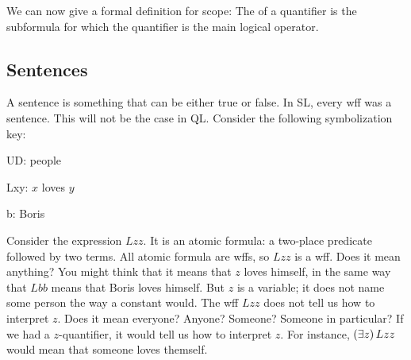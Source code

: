 We can now give a formal definition for scope: The  of a quantifier is the subformula for which the quantifier is the main logical operator. 









\subsection{Sentences}

A {sentence} is something that can be either true or false. In SL, every wff was a sentence. This will not be the case in QL. Consider the following symbolization key:
\begin{ekey}
\item[UD:] people
\item[Lxy:] $x$ loves $y$
\item[b:] Boris
\end{ekey}
Consider the expression $Lzz$. It is an atomic formula: a two-place predicate followed by two terms. All atomic formula are wffs, so $Lzz$ is a wff. Does it mean anything? You might think that it means that $z$ loves himself, in the same way that $Lbb$ means that Boris loves himself. But $z$ is a variable; it does not name some person the way a constant would. The wff $Lzz$ does not tell us how to interpret $z$. Does it mean everyone? Anyone? Someone? Someone in particular? If we had a $z$-quantifier, it would tell us how to interpret $z$. For instance, $(\exists z) \,Lzz$ would mean that someone loves themself.

